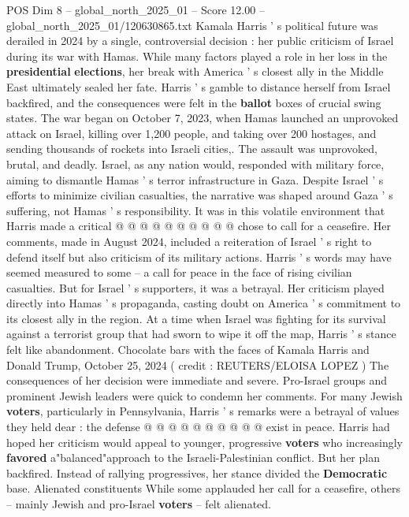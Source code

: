 \begin{textsample}{POS Dim 8 – global\_north\_2025\_01 – Score 12.00 – global\_north\_2025\_01/120630865.txt}  \label{ex:f8_pos_290}
Kamala Harris ' s political future was derailed in 2024 by a single, controversial decision : her public criticism of Israel during its war with Hamas.
While many factors played a role in her loss in the \textbf{presidential} \textbf{elections}, her break with America ' s closest ally in the Middle East ultimately sealed her fate.
Harris ' s gamble to distance herself from Israel backfired, and the consequences were felt in the \textbf{ballot} boxes of crucial swing states.
The war began on October 7, 2023, when Hamas launched an unprovoked attack on Israel, killing over 1,200 people, and taking over 200 hostages, and sending thousands of rockets into Israeli cities,.
The assault was unprovoked, brutal, and deadly.
Israel, as any nation would, responded with military force, aiming to dismantle Hamas ' s terror infrastructure in Gaza.
Despite Israel ' s efforts to minimize civilian casualties, the narrative was shaped around Gaza ' s suffering, not Hamas ' s responsibility.
It was in this volatile environment that Harris made a critical @ @ @ @ @ @ @ @ @ @ chose to call for a ceasefire.
Her comments, made in August 2024, included a reiteration of Israel ' s right to defend itself but also criticism of its military actions.
Harris ' s words may have seemed measured to some -- a call for peace in the face of rising civilian casualties.
But for Israel ' s supporters, it was a betrayal.
Her criticism played directly into Hamas ' s propaganda, casting doubt on America ' s commitment to its closest ally in the region.
At a time when Israel was fighting for its survival against a terrorist group that had sworn to wipe it off the map, Harris ' s stance felt like abandonment.
Chocolate bars with the faces of Kamala Harris and Donald Trump, October 25, 2024 ( credit : REUTERS/ELOISA LOPEZ ) The consequences of her decision were immediate and severe.
Pro-Israel groups and prominent Jewish leaders were quick to condemn her comments.
For many Jewish \textbf{voters}, particularly in Pennsylvania, Harris ' s remarks were a betrayal of values they held dear : the defense @ @ @ @ @ @ @ @ @ @ exist in peace.
Harris had hoped her criticism would appeal to younger, progressive \textbf{voters} who increasingly \textbf{favored} a"balanced"approach to the Israeli-Palestinian conflict.
But her plan backfired.
Instead of rallying progressives, her stance divided the \textbf{Democratic} base.
Alienated constituents While some applauded her call for a ceasefire, others -- mainly Jewish and pro-Israel \textbf{voters} -- felt alienated.

\end{textsample}
